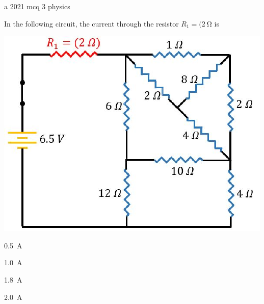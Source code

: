 \ylDisplay
{a}%
{2021}%
{mcq}%
{3}%
{physics}%
{}%
{
\ifStatement
In the following circuit, the current through the resistor $R_1=(\SI{2}{\ohm}$ is
\begin{center}
  \includegraphics[width=0.5\linewidth]{2021-mcq-03-p}
\end{center}
\fi


\SI{0.5}{\A}
\fi


\SI{1.0}{\A}
\fi


\SI{1.8}{\A}
\fi


\SI{2.0}{\A}
\fi


\ifHint

\fi


\ifSolution

\fi


\ifEstStatement

\fi



\fi



\fi



\fi



\fi


\ifEstHint

\fi


\ifEstSolution

\fi
}
